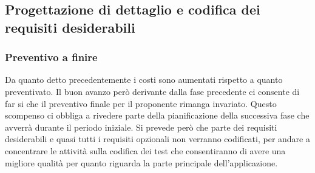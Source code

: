 		\subsection{Progettazione di dettaglio e codifica dei requisiti desiderabili} %

			\subsubsection{Preventivo a finire} %
			Da quanto detto precedentemente i costi sono aumentati rispetto a quanto preventivato. Il buon avanzo però derivante dalla fase precedente ci consente di far si che il preventivo finale per il proponente rimanga invariato.
			Questo scompenso ci obbliga a rivedere parte della pianificazione della successiva fase che avverrà durante il periodo iniziale. \newline
			Si prevede però che parte dei requisiti desiderabili e quasi tutti i requisiti opzionali non verranno codificati, per andare a concentrare le attività sulla codifica dei test che consentiranno di avere una migliore qualità per quanto riguarda la parte principale dell'applicazione.

